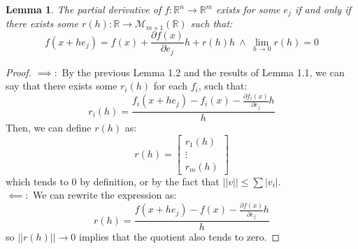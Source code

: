 \documentclass[10pt,letterpaper]{article} %
\newtheorem{lem}{Lemma}[section]
\begin{document}
\begin{lem}
The partial derivative of $f: \mathbb{R}^n \xrightarrow{} \mathbb{R}^m$ exists for some $e_j$ if and only if there exists some $r(h): \mathbb{R} \xrightarrow{} \mathcal{M}_{m \times 1}(\mathbb{R})$ such that:
\begin{equation*}
f(x + he_j) = f(x) + \frac{\partial f(x)}{\partial e_j}h + r(h)h \ \land \ \lim_{h \xrightarrow{} 0}r(h) = 0
\end{equation*} 
\end{lem}
\begin{proof}
$\implies:$ By the previous Lemma 1.2 and the results of Lemma 1.1, we can say that there exists some $r_i(h)$ for each $f_i$, such that:
\begin{equation*}
r_i(h) = \frac{f_i(x+he_j) - f_i(x) - \frac{\partial f_i(x)}{\partial e_j}h}{h}
\end{equation*}
Then, we can define $r(h)$ as:
\begin{equation*}
r(h) = \begin{bmatrix}
r_1(h)\\
\vdots\\
r_m(h)
\end{bmatrix}
\end{equation*}
which tends to $0$ by definition, or by the fact that $||v|| \leqslant \sum |v_i|$.\\

$\impliedby:$ We can rewrite the expression as:
\begin{equation*}
r(h) = \frac{f(x+he_j) - f(x) - \frac{\partial f(x)}{\partial e_j}h}{h}
\end{equation*}
so $||r(h)|| \xrightarrow{} 0$ implies that the quotient also tends to zero. 
\end{proof}
\end{document}
